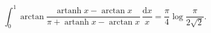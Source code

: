 %

\begin{problem}[pytanie 464769]
    \label{stack_464769}%
    \begin{equation}
        \int_0^1 \arctan \frac { \operatorname{artanh} x - \arctan x} {\pi + \operatorname{artanh} x - \arctan x}  \, \frac{\mathrm{d}x}{x} = \frac \pi 4 \log \frac{\pi}{2 \sqrt{2}}.
    \end{equation}
\end{problem}

%